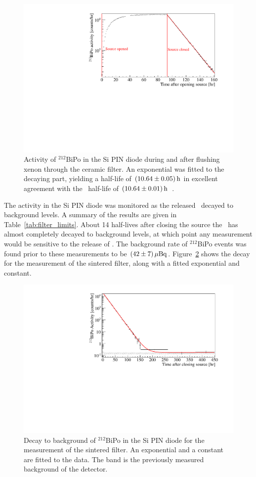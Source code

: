 \documentclass[phys,dissertation]{puthesis}
\begin{document}
\begin{figure}[htb]
\centering
\includegraphics[trim = 5 5 40 15, clip = true,width = 0.8\columnwidth]{figures/chapter_five/bipo_activity.pdf}
\caption{Activity of $^{212}$BiPo in the Si PIN diode during and after flushing xenon through the ceramic filter. An exponential was fitted to the decaying part, yielding a half-life of $(10.64\pm0.05)\,\mathrm{h}$ in excellent agreement with the \Pb~half-life of $(10.64\pm0.01)\,\mathrm{h}$~\cite{Firestone}.}
\label{fig:bipo}
\end{figure}

The activity in the Si PIN diode was monitored as the released \Pb~decayed to background levels. A summary of the results are given in Table~\ref{tab:filter_limits}. About 14 half-lives after closing the source the \Pb~has almost completely decayed to background levels, at which point any measurement would be sensitive to the release of \Ra. The background rate of $^{212}$BiPo events was found prior to these measurements to be $(42\pm7)\,\mathrm{\mu Bq}$. Figure~\ref{fig:bipo_background} shows the decay for the measurement of the sintered filter, along with a fitted exponential and constant.

\begin{figure}[htb]
\centering
\includegraphics[trim = 10 5 40 15, clip = true,width = 0.8\columnwidth]{figures/chapter_five/bipo_background_sintered.pdf}
\caption{Decay to background of $^{212}$BiPo in the Si PIN diode for the measurement of the sintered filter. An exponential and a constant are fitted to the data. The band is the previously measured background of the detector.}
\label{fig:bipo_background}
\end{figure}
\end{document}
